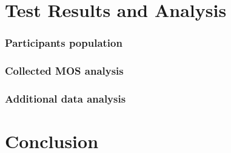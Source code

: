 \documentclass{beamer}
\begin{document}
\section{Test Results and Analysis}
\begin{frame}
	
\end{frame}


\begin{frame}
	\frametitle{Participants population}
	\label{sec:participant_population}
	
\end{frame}


\begin{frame}
	\frametitle{Collected MOS analysis}
	\label{sec:ratings}
	
\end{frame}


\begin{frame}
	\frametitle{Additional data analysis}
	\label{sec:features}
	
\end{frame}


\section{Conclusion}

\begin{frame}
	
\end{frame}



\printbibliography
\end{document}
